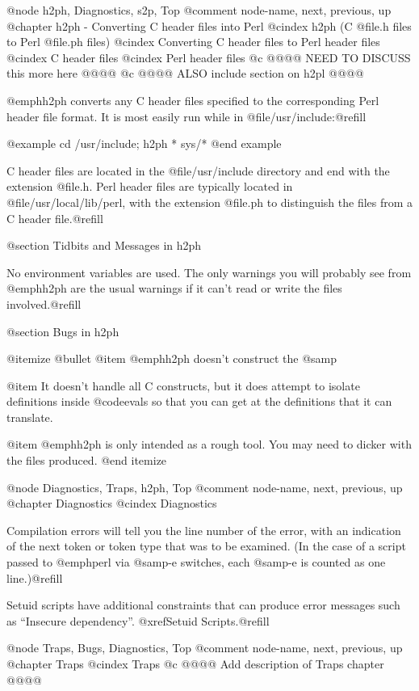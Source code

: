 {{{{{{{{{{{{{{{@node     h2ph, Diagnostics, s2p, Top
@comment  node-name,  next,  previous,  up
@chapter h2ph - Converting C header files into Perl
@cindex h2ph (C @file{.h} files to Perl @file{.ph} files)
@cindex Converting C header files to Perl header files
@cindex C header files
@cindex Perl header files
@c @@@@ NEED TO DISCUSS this more here @@@@
@c @@@@ ALSO include section on h2pl @@@@

@emph{h2ph} converts any C header files specified to the corresponding
Perl header file format.  It is most easily run while in
@file{/usr/include}:@refill

@example
cd /usr/include; h2ph * sys/*
@end example

C header files are located in the @file{/usr/include} directory and end
with the extension @file{.h}.  Perl header files are typically located
in @file{/usr/local/lib/perl}, with the extension @file{.ph} to
distinguish the files from a C header file.@refill

@section Tidbits and Messages in h2ph

No environment variables are used.  The only warnings you will probably
see from @emph{h2ph} are the usual warnings if it can't read or write
the files involved.@refill

@section Bugs in h2ph

@itemize @bullet
@item
@emph{h2ph} doesn't construct the @samp{%

@item
It doesn't handle all C constructs, but it does attempt to isolate
definitions inside @code{eval}s so that you can get at the definitions
that it can translate.

@item
@emph{h2ph} is only intended as a rough tool.  You may need to dicker
with the files produced.
@end itemize

@node     Diagnostics, Traps, h2ph, Top
@comment  node-name,  next,  previous,  up
@chapter Diagnostics
@cindex Diagnostics

Compilation errors will tell you the line number of the error, with an
indication of the next token or token type that was to be examined.  (In
the case of a script passed to @emph{perl} via @samp{-e} switches, each
@samp{-e} is counted as one line.)@refill

Setuid scripts have additional constraints that can produce error messages
such as ``Insecure dependency''.  @xref{Setuid Scripts}.@refill

@node     Traps, Bugs, Diagnostics, Top
@comment  node-name,  next,  previous,  up
@chapter Traps
@cindex Traps
@c @@@@ Add description of Traps chapter @@@@

}}}}}}}}}}}}}}}}
